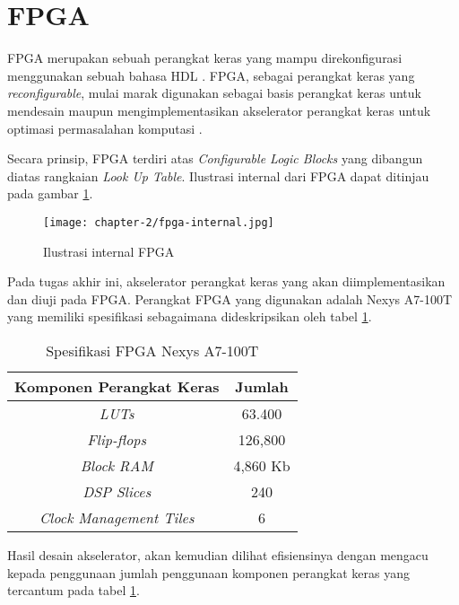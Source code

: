 \section{\acl{FPGA}}
\label{sec:fpga}

\acf{FPGA} merupakan sebuah perangkat keras yang mampu direkonfigurasi menggunakan sebuah bahasa \ac{HDL} \parencite{smith2024FPGA}. \ac{FPGA}, sebagai perangkat keras yang \textit{reconfigurable}, mulai marak digunakan sebagai basis perangkat keras untuk mendesain maupun mengimplementasikan akselerator perangkat keras untuk optimasi permasalahan komputasi \parencite{gerlach2023fpgaplacement}.

Secara prinsip, \ac{FPGA} terdiri atas \textit{Configurable Logic Blocks} yang dibangun diatas rangkaian \textit{Look Up Table}. Ilustrasi internal dari \ac{FPGA} dapat ditinjau pada gambar \ref{fig:ilustrasi-internal-fpga}.

\begin{figure}[h]
	\centering
	\texttt{[image: chapter-2/fpga-internal.jpg]}
	\caption{Ilustrasi internal \ac{FPGA} \parencite{md2015field}}
	\label{fig:ilustrasi-internal-fpga}
\end{figure}

Pada tugas akhir ini, akselerator perangkat keras yang akan diimplementasikan dan diuji pada \ac{FPGA}. Perangkat \ac{FPGA} yang digunakan adalah Nexys A7-100T yang memiliki spesifikasi sebagaimana dideskripsikan oleh tabel \ref{tab:nexys-specs}.

\begin{table}[h]
	\caption{Spesifikasi \ac{FPGA} Nexys A7-100T}
	\label{tab:nexys-specs}
	\vspace{0.25cm}
	\begin{center}
		\begin{tabular}{|c|c|}
			\hline
			Komponen Perangkat Keras        & Jumlah \tabularnewline
			\hline
			\textit{\ac{LUTs}}              & 63.400 \tabularnewline
			\textit{Flip-flops}             & 126,800 \tabularnewline
			\textit{Block \ac{RAM}}         & 4,860 Kb \tabularnewline
			\textit{DSP Slices}             & 240 \tabularnewline
			\textit{Clock Management Tiles} & 6 \tabularnewline
			\hline
		\end{tabular}
	\end{center}
\end{table}

Hasil desain akselerator, akan kemudian dilihat efisiensinya dengan mengacu kepada penggunaan jumlah penggunaan komponen perangkat keras yang tercantum pada tabel \ref{tab:nexys-specs}.
